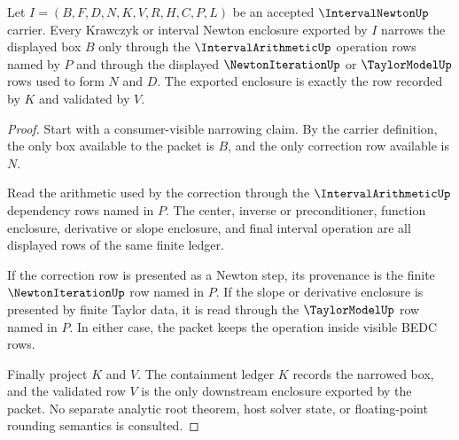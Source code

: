 \begin{theorem}
\label{thm:interval-newton-krawczyk-enclosure}
Let $I=(B,F,D,N,K,V,R,H,C,P,L)$ be an accepted $\IntervalNewtonUp$ carrier. Every Krawczyk or interval Newton enclosure exported by $I$ narrows the displayed box $B$ only through the $\IntervalArithmeticUp$ operation rows named by $P$ and through the displayed $\NewtonIterationUp$ or $\TaylorModelUp$ rows used to form $N$ and $D$. The exported enclosure is exactly the row recorded by $K$ and validated by $V$.
\end{theorem}
\begin{proof}
Start with a consumer-visible narrowing claim. By the carrier definition, the only box available to the packet is $B$, and the only correction row available is $N$.

Read the arithmetic used by the correction through the $\IntervalArithmeticUp$ dependency rows named in $P$. The center, inverse or preconditioner, function enclosure, derivative or slope enclosure, and final interval operation are all displayed rows of the same finite ledger.

If the correction row is presented as a Newton step, its provenance is the finite $\NewtonIterationUp$ row named in $P$. If the slope or derivative enclosure is presented by finite Taylor data, it is read through the $\TaylorModelUp$ row named in $P$. In either case, the packet keeps the operation inside visible BEDC rows.

Finally project $K$ and $V$. The containment ledger $K$ records the narrowed box, and the validated row $V$ is the only downstream enclosure exported by the packet. No separate analytic root theorem, host solver state, or floating-point rounding semantics is consulted.
\end{proof}

